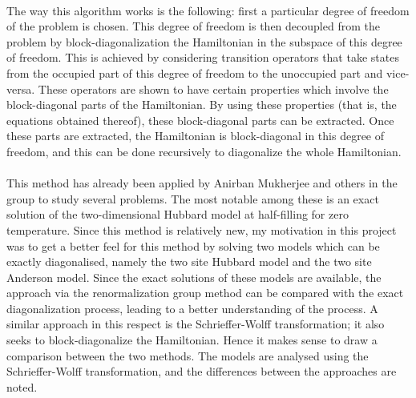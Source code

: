 \documentclass[12pt]{article}
\begin{document}
\paragraph{}
The way this algorithm works is the following: first a particular degree of freedom of the problem is chosen. This degree of freedom is then decoupled from the problem by block-diagonalization  the Hamiltonian in the subspace of this degree of freedom. This is achieved by considering transition operators that take states from the occupied part of this degree of freedom to the unoccupied part and vice-versa. These operators are shown to have certain properties which involve the block-diagonal parts of the Hamiltonian. By using these properties (that is, the equations obtained thereof), these block-diagonal parts can be extracted. Once these parts are extracted, the Hamiltonian is block-diagonal in this degree of freedom, and this can be done recursively to diagonalize the whole Hamiltonian.
\paragraph{}
This method has already been applied by Anirban Mukherjee and others in the group to study several problems. The most notable among these is an exact solution of the two-dimensional Hubbard model at half-filling for zero temperature. Since this method is relatively new, my motivation in this project was to get a better feel for this method by solving two models which can be exactly diagonalised, namely the two site Hubbard model and the two site Anderson model. Since the exact solutions of these models are available, the approach via the renormalization group method can be compared with the exact diagonalization process, leading to a better understanding of the process. A similar approach in this respect is the Schrieffer-Wolff transformation; it also seeks to block-diagonalize the Hamiltonian. Hence it makes sense to draw a comparison between the two methods. The models are analysed using the Schrieffer-Wolff transformation, and the differences between the approaches are noted.
\end{document}
